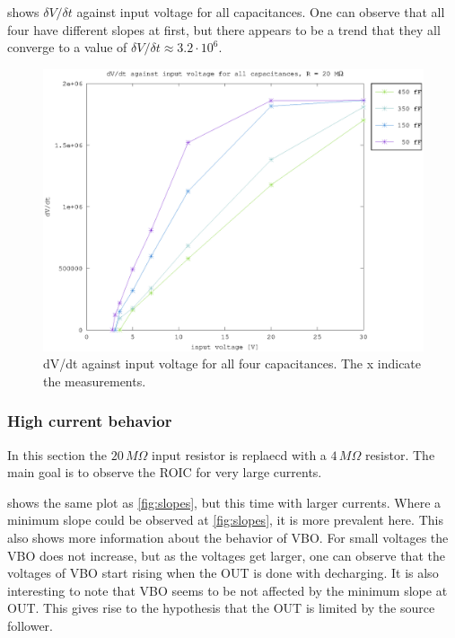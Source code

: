  shows $\delta V / \delta t$ against input voltage for all capacitances. One can observe that all four have different slopes at first, but there appears to be a trend that they all converge to a value of $\delta V/\delta t \approx 3.2\cdot10^6$.


\begin{figure}[h]
    \centering
    \includegraphics[width=\textwidth]{fig/vin_vs_time_sat.eps}
    \caption[]
        {dV/dt against input voltage for all four capacitances. The x indicate the measurements.}    
        \label{fig:e_vs_m}
\end{figure}

\clearpage
\subsubsection{High current behavior}\label{sssec:high_current_behavior}
In this section the $20\,M\Omega$ input resistor is replaecd with a $4\,M\Omega$ resistor. The main goal is to observe the ROIC for very large currents.


 shows the same plot as \cref{fig:slopes}, but this time with larger currents. Where a minimum slope could be observed at \cref{fig:slopes}, it is more prevalent here. This also shows more information about the behavior of VBO. For small voltages the VBO does not increase, but as the voltages get larger, one can observe that the voltages of VBO start rising when the OUT is done with decharging. It is also interesting to note that VBO seems to be not affected by the minimum slope at OUT. This gives rise to the hypothesis that the OUT is limited by the source follower. 

